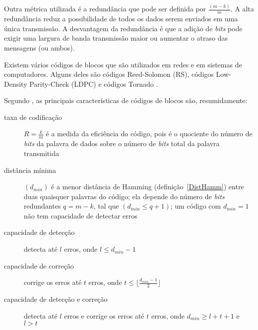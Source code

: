 Outra métrica utilizada é a redundância que pode ser definida por
$\frac{(m - k)}{m}$. A alta redundância reduz a possibilidade de
todos os dados serem enviados em uma única transmissão. A desvantagem
da redundância é que a adição de \emph{bits} pode exigir uma largura
de banda transmissão maior ou aumentar o atraso das mensagens (ou
ambos).



Existem vários códigos de blocos \cite{Byers:1998, Kubiatowicz:2000} que são utilizados em redes e em sistemas de computadores. Alguns deles são códigos Reed-Solomon (RS), códigos Low-Density Parity-Check (LDPC) e códigos Tornado \cite{Mitzenmacher:2004, RTAD:2007}.


Segundo \cite{AF:2010}, as principais características de códigos de blocos são, resumidamente:

\begin{description}
   \item [taxa de codificação] $R = \frac{k}{m}$ é a medida da eficiência do código, pois é o quociente do número de \emph{bits} da palavra de dados sobre o número de \emph{bits} total da palavra transmitida
   \item [distância mínima] $(d_{min})$ é a menor distância de Hamming (definição~\ref{DistHamm}) entre duas quaisquer palavras do código; ela depende do número de \emph{bits} redundantes $q = m - k$, tal que  $(d_{min} \leq q + 1)$; um código com $d_{min} = 1$ não tem capacidade de detectar erros
   \item [capacidade de detecção] detecta até $l$ erros, onde $l \leq d_{min} - 1$
   \item [capacidade de correção] corrige os erros até $t$ erros, onde $ t \leq \lfloor \frac{d_{min} - 1}{2} \rfloor$
   \item [capacidade de detecção e correção] detecta até $l$ erros e corrige os erros até $t$ erros, onde $d_{min} \geq l + t + 1$ e $l > t$
\end{description}

